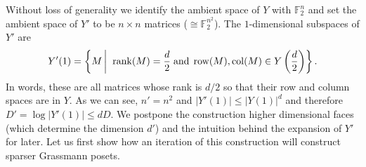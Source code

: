\documentclass[10pt,a4paper]{article}
\theoremstyle{definition}
\theoremstyle{remark}
\newcommand\sett[2]{\left\{ #1 \left| \; \vphantom{#1 #2} \right. #2  \right\}}
\newcommand{\set}[1]{\{#1\}}
\newcommand{\iprod}[1]{\langle#1\rangle}
\def\sp{\mathrm{ span}}
\newcommand{\F}{\mathbb{F}}
\newcommand{\ve}{\;\hbox{and}\;}
\DeclareMathOperator{\rank}{rank}
\DeclareMathOperator{\row}{row}
\DeclareMathOperator{\col}{col}
\renewcommand{\leq}{\leqslant}
\numberwithin{equation}{section}
\def\Y{Y}
\def\diml{d}
\def\dimlin{{\diml}}
\def\degree{D}
\begin{document}
Without loss of generality we identify the ambient space of \(\Y\) with \(\mathbb{F}_2^{n}\) and set the ambient space of \(\Y'\) to be \(n \times n\) matrices (\(\cong \mathbb{F}_2^{n^2}\)). The \(1\)-dimensional subspaces of \(\Y'\) are
\begin{equation} \label{eq:dim-1-ss}
    \Y'(1) = \sett{M}{\rank(M) = \frac{\dimlin}{2} \ve \row(M), \col(M) \in \Y \left (\frac{\dimlin }{2} \right)}.
\end{equation}
In words, these are all matrices whose rank is \(\dimlin/2\) so that their row and column spaces are in \(\Y\). As we can see, \(n' = n^2\) and \(|\Y'(1)| \leq |\Y(1)|^\dimlin\) and therefore \(\degree'=\log |\Y'(1)| \leq \dimlin \degree\). We postpone the construction higher dimensional faces (which determine the dimension \(\dimlin '\)) and the intuition behind the expansion of \(\Y'\) for later. Let us first show how an iteration of this construction will construct sparser Grassmann posets.

\end{document}
